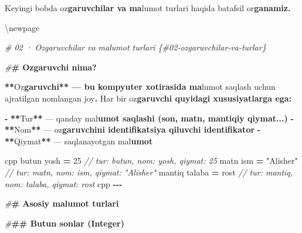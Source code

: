 \documentclass[a4paper,11pt,twoside,openright]{book}
\newenvironment{Shaded}{\begin{snugshade}}{\end{snugshade}}
\newcommand{\CharTok}[1]{\textcolor[rgb]{0.31,0.60,0.02}{#1}}
\newcommand{\CommentTok}[1]{\textcolor[rgb]{0.56,0.35,0.01}{\textit{#1}}}
\newcommand{\DecValTok}[1]{\textcolor[rgb]{0.00,0.00,0.81}{#1}}
\newcommand{\ErrorTok}[1]{\textcolor[rgb]{0.64,0.00,0.00}{\textbf{#1}}}
\newcommand{\NormalTok}[1]{#1}
\newcommand{\OperatorTok}[1]{\textcolor[rgb]{0.81,0.36,0.00}{\textbf{#1}}}
\newcommand{\PreprocessorTok}[1]{\textcolor[rgb]{0.56,0.35,0.01}{\textit{#1}}}
\newcommand{\StringTok}[1]{\textcolor[rgb]{0.31,0.60,0.02}{#1}}
\begin{document}
\begin{Shaded}
\begin{Highlighting}[]
\NormalTok{Keyingi bobda o}\CharTok{\textquotesingle{}z}\ErrorTok{garuvchilar va ma}\CharTok{\textquotesingle{}}\NormalTok{lumot turlari haqida batafsil o}\CharTok{\textquotesingle{}r}\ErrorTok{ganamiz.}


\NormalTok{\textbackslash{}newpage}

\PreprocessorTok{\# 02 · O\textquotesingle{}zgaruvchilar va ma\textquotesingle{}lumot turlari \{\#02{-}ozgaruvchilar{-}va{-}turlar\}}

\PreprocessorTok{\#}\ErrorTok{\# O\textquotesingle{}zgaruvchi nima?}

\OperatorTok{**}\NormalTok{O}\CharTok{\textquotesingle{}z}\ErrorTok{garuvchi** — bu kompyuter xotirasida ma}\CharTok{\textquotesingle{}}\NormalTok{lumot saqlash uchun ajratilgan nomlangan joy}\OperatorTok{.}\NormalTok{ Har bir o}\CharTok{\textquotesingle{}z}\ErrorTok{garuvchi quyidagi xususiyatlarga ega:}

\OperatorTok{{-}} \OperatorTok{**}\NormalTok{Tur}\OperatorTok{**}\NormalTok{ — qanday ma}\CharTok{\textquotesingle{}l}\ErrorTok{umot saqlashi (son, matn, mantiqiy qiymat...)}
\OperatorTok{{-}} \OperatorTok{**}\NormalTok{Nom}\OperatorTok{**}\NormalTok{ — o}\CharTok{\textquotesingle{}z}\ErrorTok{garuvchini identifikatsiya qiluvchi identifikator}
\OperatorTok{{-}} \OperatorTok{**}\NormalTok{Qiymat}\OperatorTok{**}\NormalTok{ — saqlanayotgan ma}\CharTok{\textquotesingle{}l}\ErrorTok{umot}

\ErrorTok{\textasciigrave{}\textasciigrave{}\textasciigrave{}}\NormalTok{cpp}
\NormalTok{butun yosh }\OperatorTok{=} \DecValTok{25}          \CommentTok{// tur: butun, nom: yosh, qiymat: 25}
\NormalTok{matn ism }\OperatorTok{=} \StringTok{"Alisher"}     \CommentTok{// tur: matn, nom: ism, qiymat: "Alisher"}
\NormalTok{mantiq talaba }\OperatorTok{=}\NormalTok{ rost     }\CommentTok{// tur: mantiq, nom: talaba, qiymat: rost}
\ErrorTok{\textasciigrave{}\textasciigrave{}\textasciigrave{}}\NormalTok{cpp}
\OperatorTok{{-}{-}{-}}

\PreprocessorTok{\#}\ErrorTok{\# Asosiy ma\textquotesingle{}lumot turlari}

\PreprocessorTok{\#}\ErrorTok{\#\# Butun sonlar (Integer)}


\end{Highlighting}
\end{Shaded}
\end{document}
